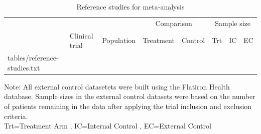 \documentclass[11pt,final,fleqn]{article}\usepackage[]{graphicx}\usepackage[]{color}
\makeatletter
\newcommand*\ExpandableInput[1]{\@@input#1 }
\makeatother
\begin{document}

\begin{table}
\scriptsize
\begin{center}
\begin{threeparttable}
\caption{Reference studies for meta-analysis} \label{tbl:reference-studies}
\begin{tabular}{llp{4cm}p{3cm}p{3cm}rrr}
\hline
\multicolumn{3}{l}{} & \multicolumn{2}{c}{Comparison} & \multicolumn{3}{c}{Sample size} \\
\cmidrule(r){4-5} \cmidrule(r){6-8}
\multicolumn{1}{l}{} & \multicolumn{1}{l}{Clinical trial} & \multicolumn{1}{c}{Population} & 
\multicolumn{1}{c}{Treatment} & \multicolumn{1}{c}{Control} & \multicolumn{1}{c}{Trt} & \multicolumn{1}{c}{IC}  & \multicolumn{1}{c}{EC} \\
\hline
\ExpandableInput{tables/reference-studies.txt}
\hline
\end{tabular}
\scriptsize Note: All external control datasetets were built using the Flatiron Health database. Sample sizes in the external control datasets were based on the number of patients remaining in the data after applying the trial inclusion and exclusion criteria.  \\
Trt=Treatment Arm , IC=Internal Control , EC=External Control
\end{threeparttable}
\end{center}
\end{table}
\end{document}

